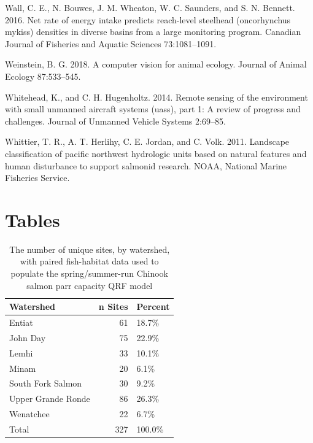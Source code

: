 \documentclass[
  12pt,
]{article}
\begin{document}
\leavevmode\hypertarget{ref-Wall2016}{}%
Wall, C. E., N. Bouwes, J. M. Wheaton, W. C. Saunders, and S. N. Bennett. 2016. Net rate of energy intake predicts reach-level steelhead (oncorhynchus mykiss) densities in diverse basins from a large monitoring program. Canadian Journal of Fisheries and Aquatic Sciences 73:1081--1091.

\leavevmode\hypertarget{ref-Weinstein2018}{}%
Weinstein, B. G. 2018. A computer vision for animal ecology. Journal of Animal Ecology 87:533--545.

\leavevmode\hypertarget{ref-Whitehead2014}{}%
Whitehead, K., and C. H. Hugenholtz. 2014. Remote sensing of the environment with small unmanned aircraft systems (uass), part 1: A review of progress and challenges. Journal of Unmanned Vehicle Systems 2:69--85.

\leavevmode\hypertarget{ref-Whittier2011}{}%
Whittier, T. R., A. T. Herlihy, C. E. Jordan, and C. Volk. 2011. Landscape classification of pacific northwest hydrologic units based on natural features and human disturbance to support salmonid research. NOAA, National Marine Fisheries Service.

\newpage

\hypertarget{tables}{%
\section{Tables}\label{tables}}

\hypertarget{tables}{}

\begin{table}[!h]

\caption{\label{tab:fish-hab-sites}The number of unique sites, by watershed, with paired fish-habitat data used to populate the spring/summer-run Chinook salmon parr capacity QRF model}
\centering
\fontsize{10}{12}\selectfont
\begin{tabular}[t]{lrl}
\toprule
Watershed & n Sites & Percent\\
\midrule
Entiat & 61 & 18.7\%\\
John Day & 75 & 22.9\%\\
Lemhi & 33 & 10.1\%\\
Minam & 20 & 6.1\%\\
South Fork Salmon & 30 & 9.2\%\\
Upper Grande Ronde & 86 & 26.3\%\\
Wenatchee & 22 & 6.7\%\\
Total & 327 & 100.0\%\\
\bottomrule
\end{tabular}
\end{table}
\end{document}
